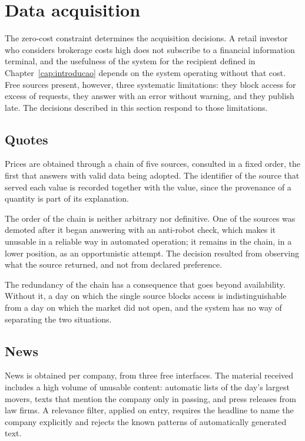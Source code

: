 \section{Data acquisition}
\label{sec:sis_dados}

The zero-cost constraint determines the acquisition decisions. A retail investor who considers
brokerage costs high does not subscribe to a financial information terminal, and the usefulness of
the system for the recipient defined in Chapter~\ref{cap:introducao} depends on the system
operating without that cost. Free sources present, however, three systematic limitations: they
block access for excess of requests, they answer with an error without warning, and they publish
late. The decisions described in this section respond to those limitations.

\subsection{Quotes}

Prices are obtained through a chain of five sources, consulted in a fixed order, the first that
answers with valid data being adopted. The identifier of the source that served each value is
recorded together with the value, since the provenance of a quantity is part of its
explanation.

The order of the chain is neither arbitrary nor definitive. One of the sources was demoted after
it began answering with an anti-robot check, which makes it unusable in a reliable way in
automated operation; it remains in the chain, in a lower position, as an opportunistic attempt.
The decision resulted from observing what the source returned, and not from declared preference.

The redundancy of the chain has a consequence that goes beyond availability. Without it, a day on
which the single source blocks access is indistinguishable from a day on which the market did not
open, and the system has no way of separating the two situations.

\subsection{News}
\label{sec:sis_fontes}

News is obtained per company, from three free interfaces. The material received includes a high
volume of unusable content: automatic lists of the day's largest movers, texts that mention the
company only in passing, and press releases from law firms. A relevance filter, applied on entry,
requires the headline to name the company explicitly and rejects the known patterns of
automatically generated text.

